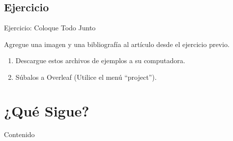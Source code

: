 \documentclass{beamer}
\begin{document}
\subsection{Ejercicio}
\begin{frame}[fragile]{Ejercicio: Coloque Todo Junto}
  
  Agregue una imagen y una bibliografía al artículo desde el ejercicio previo.
  
  \begin{enumerate}
  \item Descargue estos archivos de ejemplos a su computadora.

    \begin{center}
      
    \end{center}
    
  \item Súbalos a  Overleaf (Utilice el menú ``project'').
    
  \end{enumerate}
\end{frame}

\section{¿Qué Sigue?}

\begin{frame}{Contenido}
  \begin{multicols}{2}
    \tableofcontents[currentsection]
  \end{multicols}
\end{frame}
\end{document}
